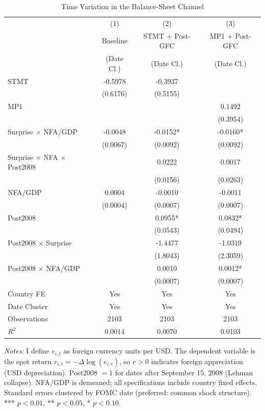 \begin{table}[htbp]
\centering
\caption{Time Variation in the Balance-Sheet Channel}
\label{tab:time_variation}
\begin{tabular}{lccc}
\hline\hline
 & (1) & (2) & (3) \\
 & Baseline & STMT + Post-GFC & MP1 + Post-GFC \\
 & (Date Cl.) & (Date Cl.) & (Date Cl.) \\
\hline
STMT & -0.5978 & -0.3937 & \\
 & (0.6176) & (0.5155) & \\
MP1 & & & 0.1492 \\
 & & & (0.3954) \\
Surprise $\times$ NFA/GDP & -0.0048 & -0.0152* & -0.0160* \\
 & (0.0067) & (0.0092) & (0.0092) \\
Surprise $\times$ NFA $\times$ Post2008 & & 0.0222 & 0.0017 \\
 & & (0.0156) & (0.0263) \\
NFA/GDP & 0.0004 & -0.0010 & -0.0011 \\
 & (0.0004) & (0.0007) & (0.0007) \\
Post2008 & & 0.0955* & 0.0832* \\
 & & (0.0543) & (0.0494) \\
Post2008 $\times$ Surprise & & -1.4477 & -1.0319 \\
 & & (1.8043) & (2.3059) \\
Post2008 $\times$ NFA/GDP & & 0.0010 & 0.0012* \\
 & & (0.0007) & (0.0007) \\
\hline
Country FE & Yes & Yes & Yes \\
Date Cluster & Yes & Yes & Yes \\
Observations & 2103 & 2103 & 2103 \\
$R^2$ & 0.0014 & 0.0070 & 0.0103 \\
\hline\hline
\end{tabular}
\begin{tablenotes}
\small
\item \textit{Notes:} I define $e_{i,t}$ as foreign currency units per USD.
The dependent variable is the spot return $r_{i,t} = -\Delta\log(e_{i,t})$,
so $r > 0$ indicates foreign appreciation (USD depreciation).
Post2008 $= 1$ for dates after September 15, 2008 (Lehman collapse).
NFA/GDP is demeaned; all specifications include country fixed effects.
Standard errors clustered by FOMC date (preferred: common shock structure).
*** $p<0.01$, ** $p<0.05$, * $p<0.10$.
\end{tablenotes}
\end{table}
